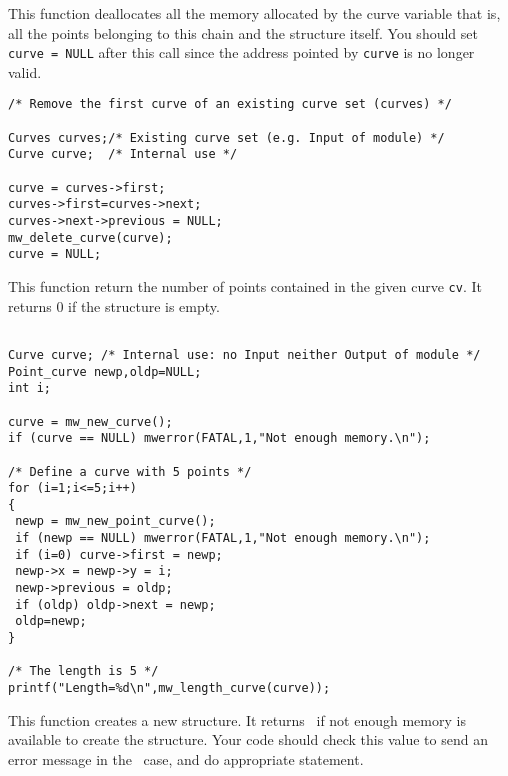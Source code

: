 \newpage %


\Description
This function deallocates all the memory allocated by the curve variable that is, all the points belonging to this chain and the \curve structure itself.
You should set \verb+curve = NULL+ after this call since the address pointed
by \verb+curve+ is no longer valid.

\Next
\Example
\begin{verbatim}
/* Remove the first curve of an existing curve set (curves) */

Curves curves;/* Existing curve set (e.g. Input of module) */
Curve curve;  /* Internal use */

curve = curves->first;
curves->first=curves->next;
curves->next->previous = NULL;
mw_delete_curve(curve);
curve = NULL;
\end{verbatim}

\newpage %


\Description
This function return the number of points contained in the given
curve \verb+cv+. It returns $0$ if the structure is empty.

\Next
\Example
\begin{verbatim}

Curve curve; /* Internal use: no Input neither Output of module */
Point_curve newp,oldp=NULL;
int i;

curve = mw_new_curve();
if (curve == NULL) mwerror(FATAL,1,"Not enough memory.\n");

/* Define a curve with 5 points */
for (i=1;i<=5;i++)
{
 newp = mw_new_point_curve();
 if (newp == NULL) mwerror(FATAL,1,"Not enough memory.\n");
 if (i=0) curve->first = newp;
 newp->x = newp->y = i;
 newp->previous = oldp;
 if (oldp) oldp->next = newp;
 oldp=newp;
} 

/* The length is 5 */
printf("Length=%d\n",mw_length_curve(curve));

\end{verbatim}
\newpage %

\Description
This function creates a new \curve structure.
It returns \Null\ if not enough memory is available to create the structure.
Your code should check this value to send an
error message in the \Null\ case, and do appropriate statement.

